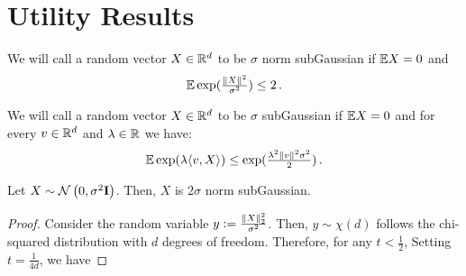 \section{Utility Results}
\label{appendix:utility_results}

\begin{definition}\label{definition:normsubGaussian}
    We will call a random vector $X \in \mathbb{R}^d$ to be $\sigma$ norm subGaussian if $\mathbb{E} X = 0$ and $$\mathbb{E} \exp(\tfrac{\|X\|^2}{\sigma^2}) \leq 2\,.$$ 
\end{definition}
\begin{definition}
    We will call a random vector $X \in \mathbb{R}^d$ to be $\sigma$ subGaussian if $\mathbb{E} X = 0$ and for every $v \in \mathbb{R}^d$ and $\lambda \in \mathbb{R}$ we have: $$\mathbb{E} \exp(\lambda \langle v,X\rangle) \leq \exp(\tfrac{\lambda^2\|v\|^2\sigma^2}{2})\,.$$ 
\end{definition}

\begin{lemma}\label{lemma:gaussian_exponential_moment}Let $X \sim \mathcal{N}\left(0, \sigma^{2}\mathbf{I}\right)$. Then, $X$ is $2\sigma$ norm subGaussian.   
\end{lemma}
\begin{proof}
    Consider the random variable $y := \frac{\left\lVert X\right\rVert_{2}^2}{\sigma^{2}}$. Then, $y \sim \chi(d)$ follows the chi-squared distribution with $d$ degrees of freedom. Therefore, for any $t < \frac{1}{2}$, 
    Setting $t = \frac{1}{4d}$, we have
\end{proof}


